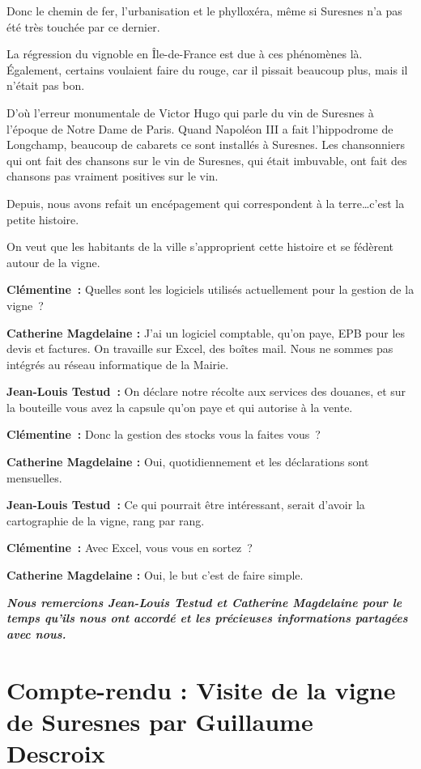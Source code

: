 \documentclass[a4paper, titlepage]{report}
\begin{document}
Donc le chemin de fer, l'urbanisation et le phylloxéra, même si Suresnes n'a pas été très touchée par ce dernier.

La régression du vignoble en Île-de-France est due à ces phénomènes là.
Également, certains voulaient faire du rouge, car il pissait beaucoup
plus, mais il n'était pas bon.

D'où l'erreur monumentale de Victor Hugo qui parle du vin de Suresnes à
l'époque de Notre Dame de Paris. Quand Napoléon III a fait l'hippodrome
de Longchamp, beaucoup de cabarets ce sont installés à Suresnes. Les
chansonniers qui ont fait des chansons sur le vin de Suresnes, qui était
imbuvable, ont fait des chansons pas vraiment positives sur le vin.

Depuis, nous avons refait un encépagement qui correspondent à la
terre\ldots{}c'est la petite histoire.

On veut que les habitants de la ville s'approprient cette histoire et se
fédèrent autour de la vigne.

\textbf{Clémentine~:} Quelles sont les logiciels utilisés actuellement
pour la gestion de la vigne~?

\textbf{Catherine Magdelaine :} J'ai un logiciel comptable, qu'on paye,
EPB pour les devis et factures. On travaille sur Excel, des boîtes mail.
Nous ne sommes pas intégrés au réseau informatique de la Mairie.

\textbf{Jean-Louis Testud~:} On déclare notre récolte aux services des
douanes, et sur la bouteille vous avez la capsule qu'on paye et
qui autorise à la vente.

\textbf{Clémentine~:} Donc la gestion des stocks vous la faites vous~?

\textbf{Catherine Magdelaine :} Oui, quotidiennement et les déclarations
sont mensuelles.

\textbf{Jean-Louis Testud~:} Ce qui pourrait être intéressant, serait
d'avoir la cartographie de la vigne, rang par rang.

\textbf{Clémentine~:} Avec Excel, vous vous en sortez~?

\textbf{Catherine Magdelaine :} Oui, le but c'est de faire simple.

\textit{\textbf{Nous remercions Jean-Louis Testud et Catherine Magdelaine pour le temps
qu'ils nous ont accordé et les précieuses informations partagées avec
nous.}}

\section{Compte-rendu : Visite de la vigne de Suresnes par Guillaume Descroix}
\end{document}
